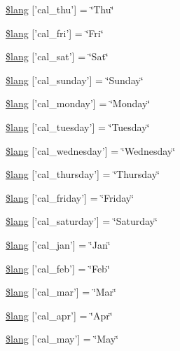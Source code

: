 \begin{DoxyCompactItemize}
\hyperlink{calendar__lang_8php_af49921f5f0bcc54c07efed2cf4b71e01}{\$lang} \mbox{[}'cal\-\_\-thu'\mbox{]} = \char`\"{}Thu\char`\"{}
\item 
\hyperlink{calendar__lang_8php_abfe2cd9d203b296392f657caf8488b53}{\$lang} \mbox{[}'cal\-\_\-fri'\mbox{]} = \char`\"{}Fri\char`\"{}
\item 
\hyperlink{calendar__lang_8php_aa1dc0204b4066fa35b0760e1437e8194}{\$lang} \mbox{[}'cal\-\_\-sat'\mbox{]} = \char`\"{}Sat\char`\"{}
\item 
\hyperlink{calendar__lang_8php_ade346ced9dfd91f19b1912bda55ed6b9}{\$lang} \mbox{[}'cal\-\_\-sunday'\mbox{]} = \char`\"{}Sunday\char`\"{}
\item 
\hyperlink{calendar__lang_8php_a55fb324dcfcabd69cc212d116b6b0254}{\$lang} \mbox{[}'cal\-\_\-monday'\mbox{]} = \char`\"{}Monday\char`\"{}
\item 
\hyperlink{calendar__lang_8php_a2f395fc42eea1e44a77e77525b266061}{\$lang} \mbox{[}'cal\-\_\-tuesday'\mbox{]} = \char`\"{}Tuesday\char`\"{}
\item 
\hyperlink{calendar__lang_8php_a85c82aef005144770cf7356945a85819}{\$lang} \mbox{[}'cal\-\_\-wednesday'\mbox{]} = \char`\"{}Wednesday\char`\"{}
\item 
\hyperlink{calendar__lang_8php_a3ab3ea291fddc8063b57a25cfbc7cf0f}{\$lang} \mbox{[}'cal\-\_\-thursday'\mbox{]} = \char`\"{}Thursday\char`\"{}
\item 
\hyperlink{calendar__lang_8php_a5be751a9260fe00120263d6e1f41de8c}{\$lang} \mbox{[}'cal\-\_\-friday'\mbox{]} = \char`\"{}Friday\char`\"{}
\item 
\hyperlink{calendar__lang_8php_aff3fc79a60ccf1f09bfe1f4387105c4b}{\$lang} \mbox{[}'cal\-\_\-saturday'\mbox{]} = \char`\"{}Saturday\char`\"{}
\item 
\hyperlink{calendar__lang_8php_a830b34d4425cdab2632056ef2860de62}{\$lang} \mbox{[}'cal\-\_\-jan'\mbox{]} = \char`\"{}Jan\char`\"{}
\item 
\hyperlink{calendar__lang_8php_ac26ad55691325913e5d0f7156c95ff18}{\$lang} \mbox{[}'cal\-\_\-feb'\mbox{]} = \char`\"{}Feb\char`\"{}
\item 
\hyperlink{calendar__lang_8php_a22ee24632deb286ad4efb833e2fe7533}{\$lang} \mbox{[}'cal\-\_\-mar'\mbox{]} = \char`\"{}Mar\char`\"{}
\item 
\hyperlink{calendar__lang_8php_a61653bb502ac4775a4186ae145e9ff78}{\$lang} \mbox{[}'cal\-\_\-apr'\mbox{]} = \char`\"{}Apr\char`\"{}
\item 
\hyperlink{calendar__lang_8php_a7e77a974617dd3fd0ab8d66f59125fdb}{\$lang} \mbox{[}'cal\-\_\-may'\mbox{]} = \char`\"{}May\char`\"{}

\end{DoxyCompactItemize}
